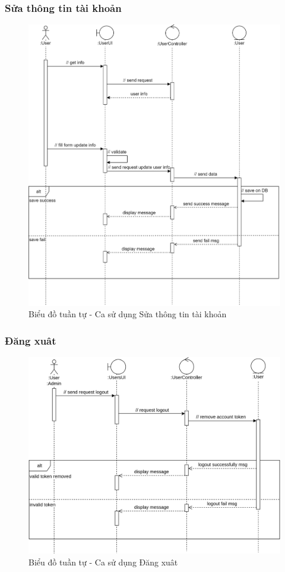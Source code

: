 \documentclass[./../main.tex]{subfiles}
\begin{document}
\subsubsection{Sửa thông tin tài khoản}
\begin{figure}[H]
	\centering
	\includegraphics[width=\linewidth]{./img/uc4.png}
	\caption{Biểu đồ tuần tự - Ca sử dụng Sửa thông tin tài khoản}
\end{figure}

\subsubsection{Đăng xuât}
\begin{figure}[H]
	\centering
	\includegraphics[width=\linewidth]{./img/uc5.png}
	\caption{Biểu đồ tuần tự - Ca sử dụng Đăng xuât}
\end{figure}
\end{document}

